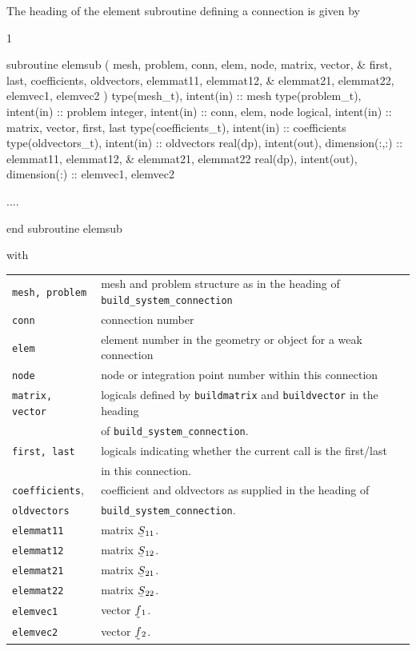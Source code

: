 The heading of the element subroutine defining a connection is given by
\begin{listing}{1}
   
  subroutine elemsub ( mesh, problem, conn, elem, node, matrix, vector, &
    first, last, coefficients, oldvectors, elemmat11, elemmat12, &
    elemmat21, elemmat22, elemvec1, elemvec2 )
    type(mesh_t), intent(in) :: mesh
    type(problem_t), intent(in) :: problem
    integer, intent(in) :: conn, elem, node
    logical, intent(in) :: matrix, vector, first, last
    type(coefficients_t), intent(in) :: coefficients
    type(oldvectors_t), intent(in) :: oldvectors
    real(dp), intent(out), dimension(:,:) :: elemmat11, elemmat12, &
      elemmat21, elemmat22
    real(dp), intent(out), dimension(:) :: elemvec1, elemvec2

     ....

  end subroutine elemsub

\end{listing}
with\\[2ex]
\begin{tabular}{ll}
\texttt{mesh, problem} & mesh and problem structure as in the heading of
                           \texttt{build\_system\_connection}\\
\texttt{conn} & connection number \\
\texttt{elem} & element number in the geometry or object
                for a weak connection \\
\texttt{node} & node or integration point number within this connection\\
\texttt{matrix, vector} & logicals defined by \texttt{buildmatrix} and
                         \texttt{buildvector} in the heading \\
                        & of \texttt{build\_system\_connection}.\\
\texttt{first, last} & logicals indicating whether the current call
    is the first/last \\ & in this connection. \\
\texttt{coefficients}, & coefficient and oldvectors as supplied
        in the heading of \\
\texttt{oldvectors} & \hfill \texttt{build\_system\_connection}.\\
\texttt{elemmat11} & matrix $\mat S_{11}$. \\
\texttt{elemmat12} & matrix $\mat S_{12}$. \\
\texttt{elemmat21} & matrix $\mat S_{21}$. \\
\texttt{elemmat22} & matrix $\mat S_{22}$. \\
\texttt{elemvec1} & vector $\col f_{1}$. \\
\texttt{elemvec2} & vector $\col f_{2}$.
\end{tabular}\\[2ex]

